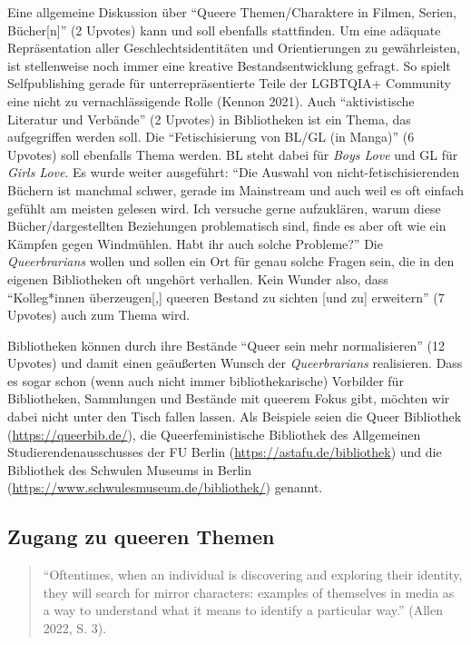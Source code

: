 \documentclass[a4paper,
fontsize=11pt,
oneside,
numbers=noperiodatend,
parskip=half-,
bibliography=totoc,
final
]{scrartcl}
\begin{document}
Eine allgemeine Diskussion über \enquote{Queere Themen/Charaktere in
Filmen, Serien, Bücher{[}n{]}} (2 Upvotes) kann und soll ebenfalls
stattfinden. Um eine adäquate Repräsentation aller
Geschlechtsidentitäten und Orientierungen zu gewährleisten, ist
stellenweise noch immer eine kreative Bestandsentwicklung gefragt. So
spielt Selfpublishing gerade für unterrepräsentierte Teile der LGBTQIA+
Community eine nicht zu vernachlässigende Rolle (Kennon 2021). Auch
\enquote{aktivistische Literatur und Verbände} (2 Upvotes) in
Bibliotheken ist ein Thema, das aufgegriffen werden soll. Die
\enquote{Fetischisierung von BL/GL (in Manga)} (6 Upvotes) soll
ebenfalls Thema werden. BL steht dabei für \emph{Boys Love} und GL für
\emph{Girls Love}. Es wurde weiter ausgeführt: \enquote{Die Auswahl von
nicht-fetischisierenden Büchern ist manchmal schwer, gerade im
Mainstream und auch weil es oft einfach gefühlt am meisten gelesen wird.
Ich versuche gerne aufzuklären, warum diese Bücher/dargestellten
Beziehungen problematisch sind, finde es aber oft wie ein Kämpfen gegen
Windmühlen. Habt ihr auch solche Probleme?} Die \emph{Queerbrarians}
wollen und sollen ein Ort für genau solche Fragen sein, die in den
eigenen Bibliotheken oft ungehört verhallen. Kein Wunder also, dass
\enquote{Kolleg*innen überzeugen{[},{]} queeren Bestand zu sichten
{[}und zu{]} erweitern} (7 Upvotes) auch zum Thema wird.

Bibliotheken können durch ihre Bestände \enquote{Queer sein mehr
normalisieren} (12 Upvotes) und damit einen geäußerten Wunsch der
\emph{Queerbrarians} realisieren. Dass es sogar schon (wenn auch nicht
immer bibliothekarische) Vorbilder für Bibliotheken, Sammlungen und
Bestände mit queerem Fokus gibt, möchten wir dabei nicht unter den Tisch
fallen lassen. Als Beispiele seien die Queer Bibliothek
(\url{https://queerbib.de/}), die Queerfeministische Bibliothek des
Allgemeinen Studierendenausschusses der FU Berlin
(\url{https://astafu.de/bibliothek}) und die Bibliothek des Schwulen
Museums in Berlin (\url{https://www.schwulesmuseum.de/bibliothek/})
genannt.

\subsection{Zugang zu queeren Themen}\label{zugang-zu-queeren-themen}

\begin{quote}
\enquote{Oftentimes, when an individual is discovering and exploring their
identity, they will search for mirror characters: examples of themselves
in media as a way to understand what it means to identify a particular
way.} (Allen 2022, S. 3).
\end{quote}
\end{document}
